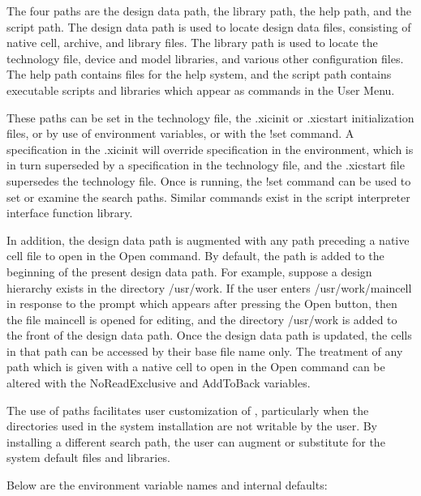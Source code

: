 The four paths are the design data path, the library path, the help
path, and the script path.  The design data path is used to locate
design data files, consisting of native cell, archive, and library
files.  The library path is used to locate the technology file, device
and model libraries, and various other configuration files.  The help
path contains files for the help system, and the script path contains
executable scripts and libraries which appear as commands in the {\cb
User Menu}.

These paths can be set in the technology file, the {\vt .xicinit} or
{\vt .xicstart} initialization files, or by use of environment
variables, or with the {\cb !set} command.  A specification in the
{\vt .xicinit} will override specification in the environment, which
is in turn superseded by a specification in the technology file, and
the {\vt .xicstart} file supersedes the technology file.  Once {\Xic}
is running, the {\cb !set} command can be used to set or examine the
search paths.  Similar commands exist in the script interpreter
interface function library.

In addition, the design data path is augmented with any path preceding
a native cell file to open in the {\cb Open} command.  By default, the
path is added to the beginning of the present design data path.  For
example, suppose a design hierarchy exists in the directory {\vt
/usr/work}.  If the user enters {\vt /usr/work/maincell} in response
to the prompt which appears after pressing the {\cb Open} button, then
the file {\et maincell} is opened for editing, and the directory {\vt
/usr/work} is added to the front of the design data path.  Once the
design data path is updated, the cells in that path can be accessed by
their base file name only.  The treatment of any path which is given
with a native cell to open in the {\cb Open} command can be altered
with the {\et NoReadExclusive} and {\et AddToBack} variables.

The use of paths facilitates user customization of {\Xic}, particularly
when the directories used in the system installation are not writable
by the user.  By installing a different search path, the user can
augment or substitute for the system default files and libraries.

Below are the environment variable names and internal defaults:

